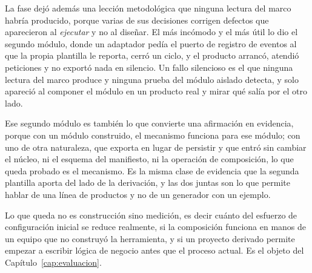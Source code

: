 La fase dejó además una lección metodológica que ninguna lectura del marco
habría producido, porque varias de sus decisiones corrigen defectos que
aparecieron al \emph{ejecutar} y no al diseñar. El más incómodo y el más útil
lo dio el segundo módulo, donde un adaptador pedía el puerto de registro de
eventos al que la propia plantilla le reporta, cerró un ciclo, y el producto
arrancó,
atendió peticiones y no exportó nada en silencio. Un fallo silencioso es el
que ninguna lectura del marco produce y ninguna prueba del módulo aislado
detecta, y solo apareció al componer el módulo en un producto real y mirar
qué salía por el otro lado.

Ese segundo módulo es también lo que convierte una afirmación en evidencia, porque
con un módulo construido, el mecanismo funciona para ese módulo; con uno de
otra naturaleza, que exporta en lugar de persistir y que entró sin cambiar el
núcleo, ni el esquema del manifiesto, ni la operación de composición, lo que
queda probado es el mecanismo. Es la misma clase de evidencia que la segunda
plantilla aporta del lado de la derivación, y las dos juntas son lo que
permite hablar de una línea de productos y no de un generador con un ejemplo.

Lo que queda no es construcción sino medición, es decir cuánto del esfuerzo de
configuración inicial se reduce realmente, si la composición funciona en
manos de un equipo que no construyó la herramienta, y si un proyecto derivado
permite empezar a escribir lógica de negocio antes que el proceso actual. Es
el objeto del Capítulo~\ref{cap:evaluacion}.
